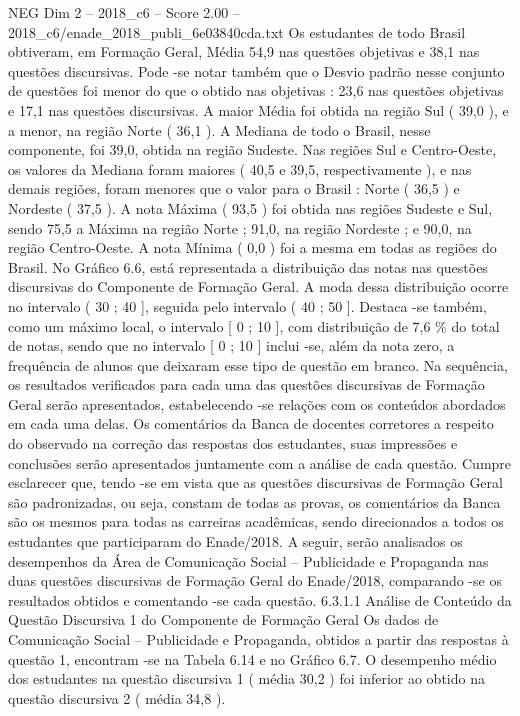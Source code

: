 \begin{textsample}{NEG Dim 2 – 2018\_c6 – Score 2.00 – 2018\_c6/enade\_2018\_publi\_6e03840cda.txt}
Os estudantes de todo Brasil obtiveram, em Formação Geral, Média 54,9 nas questões objetivas e 38,1 nas questões discursivas.
Pode -se notar também que o Desvio padrão nesse conjunto de questões foi menor do que o obtido nas objetivas : 23,6 nas questões objetivas e 17,1 nas questões discursivas.
A maior Média foi obtida na região Sul ( 39,0 ), e a menor, na região Norte ( 36,1 ).
A Mediana de todo o Brasil, nesse componente, foi 39,0, obtida na região Sudeste.
Nas regiões Sul e Centro-Oeste, os valores da Mediana foram maiores ( 40,5 e 39,5, respectivamente ), e nas demais regiões, foram menores que o valor para o Brasil : Norte ( 36,5 ) e Nordeste ( 37,5 ).
A nota Máxima ( 93,5 ) foi obtida nas regiões Sudeste e Sul, sendo 75,5 a Máxima na região Norte ; 91,0, na região Nordeste ; e 90,0, na região Centro-Oeste.
A nota Mínima ( 0,0 ) foi a mesma em todas as regiões do Brasil.
No Gráfico 6.6, está representada a distribuição das notas nas questões discursivas do Componente de Formação Geral.
A moda dessa distribuição ocorre no intervalo ( 30 ; 40 ], seguida pelo intervalo ( 40 ; 50 ].
Destaca -se também, como um máximo local, o intervalo [ 0 ; 10 ], com distribuição de 7,6 \% do total de notas, sendo que no intervalo [ 0 ; 10 ] inclui -se, além da nota zero, a frequência de alunos que deixaram esse tipo de questão em branco.
Na sequência, os resultados verificados para cada uma das questões discursivas de Formação Geral serão apresentados, estabelecendo -se relações com os conteúdos abordados em cada uma delas.
Os comentários da Banca de docentes corretores a respeito do observado na correção das respostas dos estudantes, suas impressões e conclusões serão apresentados juntamente com a análise de cada questão.
Cumpre esclarecer que, tendo -se em vista que as questões discursivas de Formação Geral são padronizadas, ou seja, constam de todas as provas, os comentários da Banca são os mesmos para todas as carreiras acadêmicas, sendo direcionados a todos os estudantes que participaram do Enade/2018.
A seguir, serão analisados os desempenhos da Área de Comunicação Social – Publicidade e Propaganda nas duas questões discursivas de Formação Geral do Enade/2018, comparando -se os resultados obtidos e comentando -se cada questão. 6.3.1.1 Análise de Conteúdo da Questão Discursiva 1 do Componente de Formação Geral Os dados de Comunicação Social – Publicidade e Propaganda, obtidos a partir das respostas à questão 1, encontram -se na Tabela 6.14 e no Gráfico 6.7.
O desempenho médio dos estudantes na questão discursiva 1 ( média 30,2 ) foi inferior ao obtido na questão discursiva 2 ( média 34,8 ).

\end{textsample}
